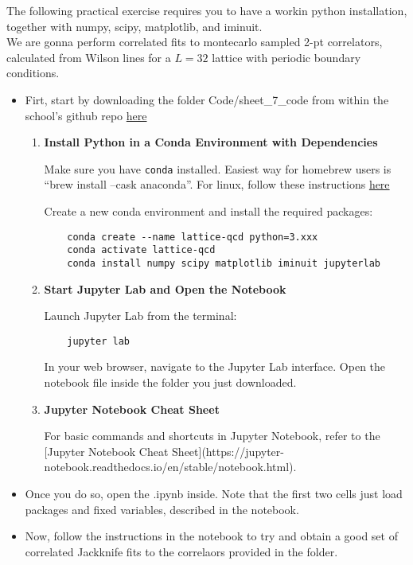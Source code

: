 The following practical exercise requires you to have a workin python installation, together with numpy, scipy, matplotlib, and iminuit.\\
We are gonna perform correlated fits to montecarlo sampled 2-pt correlators, calculated from Wilson lines for a $L=32$ lattice with periodic boundary conditions.\\
\begin{itemize}
\item Firt, start by downloading the folder Code/sheet\_7\_code from within the school's github repo \href{https://github.com/JointPhysicsAnalysisCenter/MTHS-Material}{here}
\begin{enumerate}
    \item \textbf{Install Python in a Conda Environment with Dependencies}
    
    Make sure you have \texttt{conda} installed. Easiest way for homebrew users is ``brew install --cask anaconda''. For linux, follow these instructions \href{https://docs.conda.io/projects/conda/en/latest/user-guide/install/linux.html}{here}

    Create a new conda environment and install the required packages:
    \begin{verbatim}
    conda create --name lattice-qcd python=3.xxx
    conda activate lattice-qcd
    conda install numpy scipy matplotlib iminuit jupyterlab
    \end{verbatim}
    
    \item \textbf{Start Jupyter Lab and Open the Notebook}
    
    Launch Jupyter Lab from the terminal:
    \begin{verbatim}
    jupyter lab
    \end{verbatim}
    In your web browser, navigate to the Jupyter Lab interface. Open the notebook file inside the folder you just downloaded.
    
    \item \textbf{Jupyter Notebook Cheat Sheet}
    
    For basic commands and shortcuts in Jupyter Notebook, refer to the [Jupyter Notebook Cheat Sheet](https://jupyter-notebook.readthedocs.io/en/stable/notebook.html).
    \end{enumerate}
\item Once you do so, open the .ipynb inside. Note that the first two cells just load packages and fixed variables, described in the notebook.
\item Now, follow the instructions in the notebook to try and obtain a good set of correlated Jackknife fits to the correlaors provided in the folder.
\end{itemize}